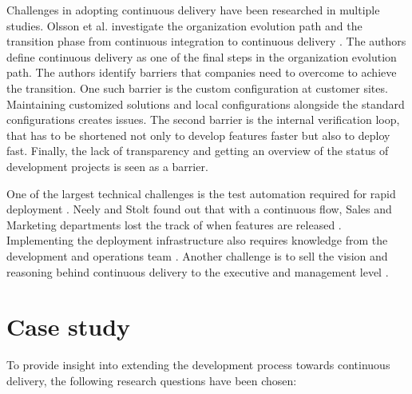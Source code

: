 \documentclass[lnbip]{svmultln}
\begin{document}
Challenges in adopting continuous delivery have been researched in multiple studies. Olsson et al. investigate the organization evolution path and the transition phase from continuous integration to continuous delivery \cite{olsson2012climbing}.  The authors define continuous delivery as one of the final steps in the organization evolution path. The authors identify barriers that companies need to overcome to achieve the transition. One such barrier is the custom configuration at customer sites. Maintaining customized solutions and local configurations alongside the standard configurations creates issues. The second barrier is the internal verification loop, that has to be shortened not only to develop features faster but also to deploy fast. Finally, the lack of transparency and getting an overview of the status of development projects is seen as a barrier.

One of the largest technical challenges is the test automation required for rapid deployment \cite{cdbook, humble2006deployment}. Neely and Stolt found out that with a continuous flow, Sales and Marketing departments lost the track of when features are released \cite{neely2013continuous}. Implementing the deployment infrastructure also requires knowledge from the development and operations team \cite{humble2006deployment}. Another challenge is to sell the vision and reasoning behind continuous delivery to the executive and management level \cite{neely2013continuous}.


\section{Case study}
To provide insight into extending the development process towards continuous delivery, the following research questions have been chosen: \newline

\end{document}
